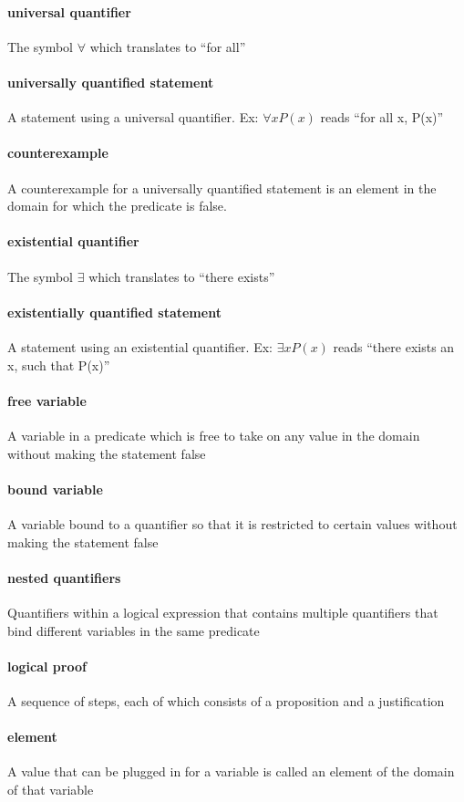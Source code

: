 \documentclass[a4paper]{article}
\begin{document}
\paragraph{universal quantifier} The symbol $\forall$ which translates to ``for all''
\paragraph{universally quantified statement} A statement using a universal quantifier. Ex: $\forall x P(x)$ reads ``for all x, P(x)''
\paragraph{counterexample} A counterexample for a universally quantified statement is an element in the domain for which the predicate is false.
\paragraph{existential quantifier} The symbol $\exists$ which translates to ``there exists''
\paragraph{existentially quantified statement} A statement using an existential quantifier. Ex: $\exists x P(x)$ reads ``there exists an x, such that P(x)''
\paragraph{free variable} A variable in a predicate which is free to take on any value in the domain without making the statement false
\paragraph{bound variable} A variable bound to a quantifier so that it is restricted to certain values without making the statement false
\paragraph{nested quantifiers} Quantifiers within a logical expression that contains multiple quantifiers that bind different variables in the same predicate
\paragraph{logical proof} A sequence of steps, each of which consists of a proposition and a justification
\paragraph{element} A value that can be plugged in for a variable is called an element of the domain of that variable
\end{document}

